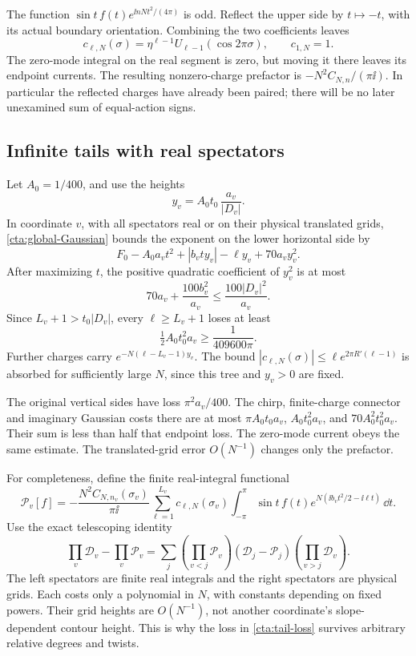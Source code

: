 The function \(\sin t\,f(t)e^{\ii nNt^2/(4\pi)}\) is odd.
Reflect the upper side by \(t\mapsto-t\), with its actual
boundary orientation. Combining the two coefficients leaves
\[
 c_{\ell,N}(\sigma)=
   \eta^{\ell-1}U_{\ell-1}(\cos2\pi\sigma),\qquad c_{1,N}=1.
\]
The zero-mode integral on the real segment is zero, but moving
it there leaves its endpoint currents. The resulting
nonzero-charge prefactor is \(-N^2C_{N,n}/(\pi\ii)\).
In particular the reflected charges have already been paired;
there will be no later unexamined sum of equal-action signs.

\subsection{Infinite tails with real spectators}
Let \(A_0=1/400\), and use the heights
\begin{equation}\label{cta:height}
 y_v=A_0t_0\,\frac{a_v}{|D_v|}.
\end{equation}
In coordinate \(v\), with all spectators real or on their
physical translated grids, \eqref{cta:global-Gaussian} bounds
the exponent on the lower horizontal side by
\[
 F_0-A_0a_v t^2+|b_vty_v|-\ell y_v+70a_vy_v^2.
 \]
After maximizing \(t\), the positive quadratic coefficient
of \(y_v^2\) is at most
\[
 70a_v+\frac{100b_v^2}{a_v}
                  \le\frac{100|D_v|^2}{a_v}.
 \]
Since \(L_v+1>t_0|D_v|\), every \(\ell\ge L_v+1\) loses at least
\begin{equation}\label{cta:tail-loss}
 \tfrac12 A_0t_0^2a_v\ge\frac1{409600\pi}.
\end{equation}
Further charges carry \(e^{-N(\ell-L_v-1)y_v}\).
The bound
\(|c_{\ell,N}(\sigma)|\le
\ell e^{2\pi R'(\ell-1)}\) is absorbed for sufficiently large
\(N\), since this tree and \(y_v>0\) are fixed.

The original vertical sides have loss
\(\pi^2a_v/400\).
The chirp, finite-charge connector and imaginary Gaussian
costs there are at most
\(\pi A_0t_0a_v\), \(A_0t_0^2a_v\), and
\(70A_0^2t_0^2a_v\). Their sum is less than half that
endpoint loss. The zero-mode current obeys the same estimate.
The translated-grid error \(O(N^{-1})\) changes only the
prefactor.

For completeness, define the finite real-integral functional
\[
 \mathcal P_v[f]=-\frac{N^2C_{N,n_v}(\sigma_v)}{\pi\ii}
   \sum_{\ell=1}^{L_v}c_{\ell,N}(\sigma_v)
   \int_{-\pi}^{\pi}\sin t\,f(t)
            e^{N(\ii b_vt^2/2-\ii\ell t)}\,\dd t .
\]
Use the exact telescoping identity
\begin{equation}\label{cta:telescoping}
 \prod_v\mathcal D_v-\prod_v\mathcal P_v
 =\sum_j\left(\prod_{v<j}\mathcal P_v\right)
        (\mathcal D_j-\mathcal P_j)
        \left(\prod_{v>j}\mathcal D_v\right).
\end{equation}
The left spectators are finite real integrals and the right
spectators are physical grids. Each costs only a polynomial
in \(N\), with constants depending on fixed powers.
Their grid heights are \(O(N^{-1})\), not another
coordinate's slope-dependent contour height. This is why
the loss in \eqref{cta:tail-loss} survives arbitrary relative
degrees and twists.

